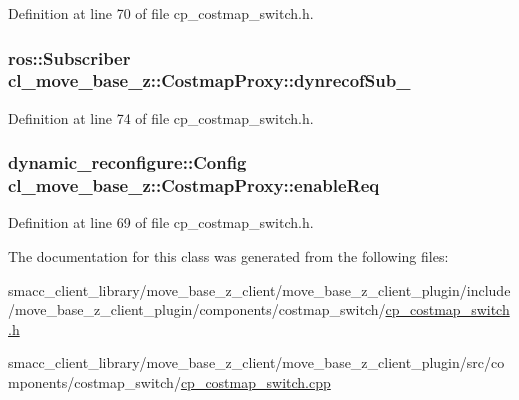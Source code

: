 Definition at line 70 of file cp\+\_\+costmap\+\_\+switch.\+h.

\subsubsection[{\texorpdfstring{dynrecof\+Sub\+\_\+}{dynrecofSub_}}]{\setlength{\rightskip}{0pt plus 5cm}ros\+::\+Subscriber cl\+\_\+move\+\_\+base\+\_\+z\+::\+Costmap\+Proxy\+::dynrecof\+Sub\+\_\+\hspace{0.3cm}{\ttfamily [private]}}\hypertarget{classcl__move__base__z_1_1CostmapProxy_a7443ac3dd932a33b3dc9d8ccc9aa2a91}{}\label{classcl__move__base__z_1_1CostmapProxy_a7443ac3dd932a33b3dc9d8ccc9aa2a91}


Definition at line 74 of file cp\+\_\+costmap\+\_\+switch.\+h.

\subsubsection[{\texorpdfstring{enable\+Req}{enableReq}}]{\setlength{\rightskip}{0pt plus 5cm}dynamic\+\_\+reconfigure\+::\+Config cl\+\_\+move\+\_\+base\+\_\+z\+::\+Costmap\+Proxy\+::enable\+Req\hspace{0.3cm}{\ttfamily [private]}}\hypertarget{classcl__move__base__z_1_1CostmapProxy_aff2defa5d265d3e8efda4849eedd3500}{}\label{classcl__move__base__z_1_1CostmapProxy_aff2defa5d265d3e8efda4849eedd3500}


Definition at line 69 of file cp\+\_\+costmap\+\_\+switch.\+h.



The documentation for this class was generated from the following files\+:\begin{DoxyCompactItemize}
\item 
smacc\+\_\+client\+\_\+library/move\+\_\+base\+\_\+z\+\_\+client/move\+\_\+base\+\_\+z\+\_\+client\+\_\+plugin/include/move\+\_\+base\+\_\+z\+\_\+client\+\_\+plugin/components/costmap\+\_\+switch/\hyperlink{cp__costmap__switch_8h}{cp\+\_\+costmap\+\_\+switch.\+h}\item 
smacc\+\_\+client\+\_\+library/move\+\_\+base\+\_\+z\+\_\+client/move\+\_\+base\+\_\+z\+\_\+client\+\_\+plugin/src/components/costmap\+\_\+switch/\hyperlink{cp__costmap__switch_8cpp}{cp\+\_\+costmap\+\_\+switch.\+cpp}\end{DoxyCompactItemize}
